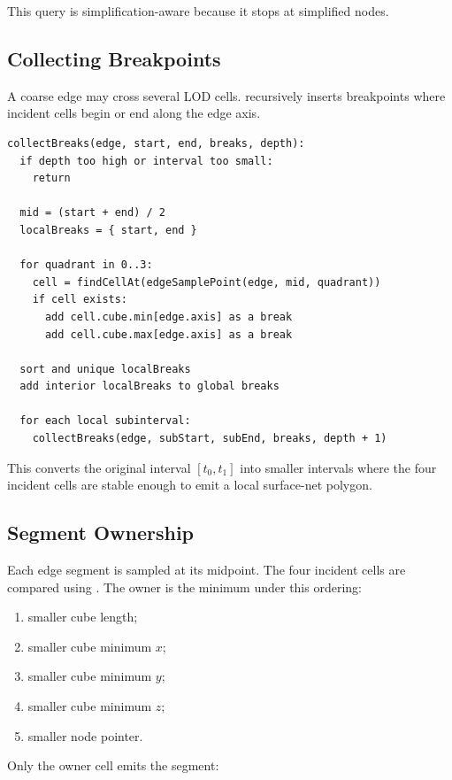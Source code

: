 \documentclass[11pt,a4paper]{article}
\newcommand{\code}[1]{\texttt{\detokenize{#1}}}
\begin{document}
This query is simplification-aware because it stops at simplified nodes.

\subsection{Collecting Breakpoints}

A coarse edge may cross several LOD cells. \code{collectBreaks} recursively inserts breakpoints where incident cells begin or end along the edge axis.

\begin{lstlisting}
collectBreaks(edge, start, end, breaks, depth):
  if depth too high or interval too small:
    return

  mid = (start + end) / 2
  localBreaks = { start, end }

  for quadrant in 0..3:
    cell = findCellAt(edgeSamplePoint(edge, mid, quadrant))
    if cell exists:
      add cell.cube.min[edge.axis] as a break
      add cell.cube.max[edge.axis] as a break

  sort and unique localBreaks
  add interior localBreaks to global breaks

  for each local subinterval:
    collectBreaks(edge, subStart, subEnd, breaks, depth + 1)
\end{lstlisting}

This converts the original interval \([t_0,t_1]\) into smaller intervals where the four incident cells are stable enough to emit a local surface-net polygon.

\subsection{Segment Ownership}

Each edge segment is sampled at its midpoint. The four incident cells are compared using \code{ownerLess}. The owner is the minimum under this ordering:

\begin{enumerate}
    \item smaller cube length;
    \item smaller cube minimum \(x\);
    \item smaller cube minimum \(y\);
    \item smaller cube minimum \(z\);
    \item smaller node pointer.
\end{enumerate}

Only the owner cell emits the segment:
\end{document}
